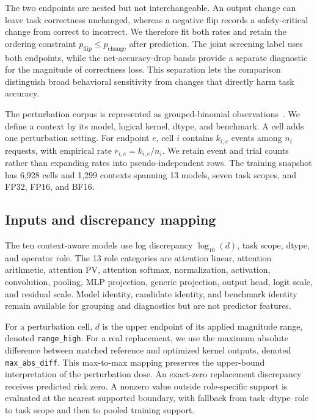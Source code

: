 \documentclass{article}
\begin{document}
The two endpoints are nested but not interchangeable. An output change can leave task correctness unchanged, whereas a negative flip records a safety-critical change from correct to incorrect. We therefore fit both rates and retain the ordering constraint $p_{\mathrm{flip}}\leq p_{\mathrm{change}}$ after prediction. The joint screening label uses both endpoints, while the net-accuracy-drop bands provide a separate diagnostic for the magnitude of correctness loss. This separation lets the comparison distinguish broad behavioral sensitivity from changes that directly harm task accuracy.

The perturbation corpus is represented as grouped-binomial observations~\citep{mccullagh1989generalized}. We define a context by its model, logical kernel, dtype, and benchmark. A cell adds one perturbation setting. For endpoint $e$, cell $i$ contains $k_{i,e}$ events among $n_i$ requests, with empirical rate $r_{i,e}=k_{i,e}/n_i$. We retain event and trial counts rather than expanding rates into pseudo-independent rows. The training snapshot has 6,928 cells and 1,299 contexts spanning 13 models, seven task scopes, and FP32, FP16, and BF16.

\subsection{Inputs and discrepancy mapping}

The ten context-aware models use log discrepancy $\log_{10}(d)$, task scope, dtype, and operator role. The 13 role categories are attention linear, attention arithmetic, attention PV, attention softmax, normalization, activation, convolution, pooling, MLP projection, generic projection, output head, logit scale, and residual scale. Model identity, candidate identity, and benchmark identity remain available for grouping and diagnostics but are not predictor features.

For a perturbation cell, $d$ is the upper endpoint of its applied magnitude range, denoted \texttt{range\_high}. For a real replacement, we use the maximum absolute difference between matched reference and optimized kernel outputs, denoted \texttt{max\_abs\_diff}. This max-to-max mapping preserves the upper-bound interpretation of the perturbation dose. An exact-zero replacement discrepancy receives predicted risk zero. A nonzero value outside role-specific support is evaluated at the nearest supported boundary, with fallback from task--dtype--role to task scope and then to pooled training support.
\end{document}
